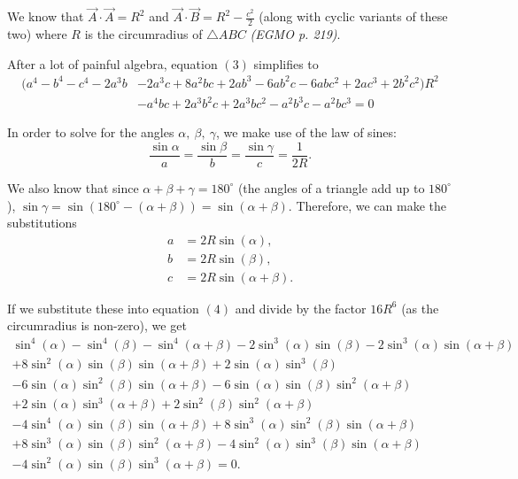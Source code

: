 \documentclass[12pt]{article}
\begin{document}
\begin{solution}{5}
    We know that $\vec A \cdot \vec A = R^2$ and $\vec A \cdot \vec B = R^2-\frac{c^2}2$
    (along with cyclic variants of these two) where $R$ is the circumradius of $\triangle ABC$ \textit{(EGMO p. 219)}.
    
    After a lot of painful algebra, equation $(3)$ simplifies to
    \begin{equation*} \tag{4}
        \begin{split}
            (a^4-b^4-c^4-2a^3b&-2a^3c+8a^2bc+2ab^3-6ab^2c-6abc^2+2ac^3+2b^2c^2)R^2\\
        	&-a^4bc+2a^3b^2c+2a^3bc^2-a^2b^3c-a^2bc^3=0
    	\end{split}
    \end{equation*}
    
    In order to solve for the angles $\alpha,\ \beta,\ \gamma$, we make use of the law of sines:
    \begin{equation*}
        \frac{\sin\alpha}a = \frac{\sin\beta}b = \frac{\sin\gamma}c = \frac1{2R}.
    \end{equation*}
    
    We also know that since $\alpha+\beta+\gamma=180^{\circ}$ (the angles of a triangle add up to $180^\circ$),
    $\sin \gamma = \sin(180^\circ-(\alpha+\beta)) = \sin(\alpha+\beta)$. Therefore, we can make the substitutions
    \begin{align*}
        a &= 2R\sin(\alpha), \\
        b &= 2R\sin(\beta), \\
        c &= 2R\sin(\alpha+\beta).
    \end{align*}
    
    If we substitute these into equation $(4)$ and divide by the factor $16R^6$ (as the circumradius is non-zero), we get
    \begin{gather*} \tag{5}
        \sin^4(\alpha)-\sin^4(\beta)
        -\sin^4(\alpha+\beta)
        -2\sin^3(\alpha)\sin(\beta)
        -2\sin^3(\alpha)\sin(\alpha+\beta)\\
        +8\sin^2(\alpha)\sin(\beta)\sin(\alpha+\beta)
        +2\sin(\alpha)\sin^3(\beta)\\
        -6\sin(\alpha)\sin^2(\beta)\sin(\alpha+\beta)
        -6\sin(\alpha)\sin(\beta)\sin^2(\alpha+\beta)\\
        +2\sin(\alpha)\sin^3(\alpha+\beta)
        +2\sin^2(\beta)\sin^2(\alpha+\beta)\\
        -4\sin^4(\alpha)\sin(\beta)\sin(\alpha+\beta)
        +8\sin^3(\alpha)\sin^2(\beta)\sin(\alpha+\beta)\\
        +8\sin^3(\alpha)\sin(\beta)\sin^2(\alpha+\beta)
        -4\sin^2(\alpha)\sin^3(\beta)\sin(\alpha+\beta)\\
        -4\sin^2(\alpha)\sin(\beta)\sin^3(\alpha+\beta) = 0.
    \end{gather*}
    

\end{solution}
\end{document}
